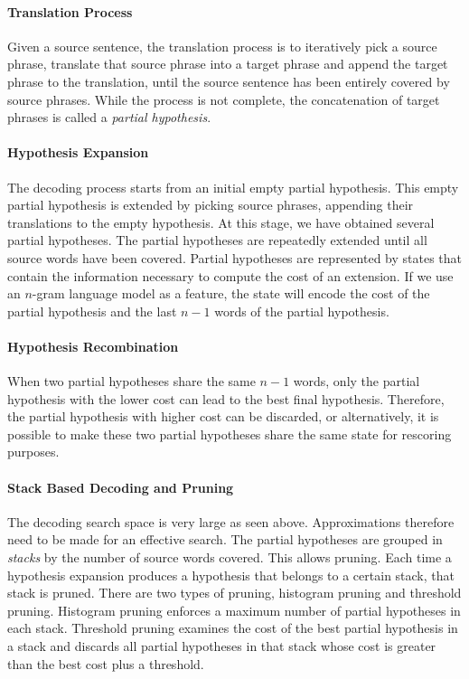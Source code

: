 \paragraph{Translation Process}

Given a source sentence, the translation process is to iteratively
pick a source phrase, translate that source phrase into a target phrase
and append the target phrase to the translation, until the source
sentence has been entirely covered by source phrases. While the process is not
complete, the concatenation of target phrases is called a
\emph{partial hypothesis}.

\paragraph{Hypothesis Expansion}

The decoding process starts from an initial empty partial hypothesis.
This empty partial hypothesis is extended by picking source phrases,
appending their translations to the empty hypothesis.
At this stage, we have obtained several partial hypotheses.
The partial hypotheses are repeatedly extended until
all source words have been covered.
Partial hypotheses are represented by states
that contain the information necessary to
compute the cost of an extension.
If we use an $n$-gram language model as a feature,
the state will encode the cost of the partial hypothesis
and the last $n - 1$ words of the partial hypothesis.

\paragraph{Hypothesis Recombination}
\label{sec:phraseBasedHypothesisRecombination}

When two partial hypotheses share the same $n - 1$
words, only the partial hypothesis with the lower
cost can lead to the best final hypothesis. Therefore,
the partial hypothesis with higher cost can be discarded, or
alternatively, it is possible to make these two partial
hypotheses share the same state for rescoring purposes.

\paragraph{Stack Based Decoding and Pruning}
\label{sec:phraseBasedPruning}

The decoding search space is very large
as seen above. Approximations
therefore need to be made for an effective search.
The partial hypotheses are grouped in \emph{stacks}
by the number of source words covered.
This allows pruning. Each time a hypothesis expansion produces a hypothesis that
belongs to a certain stack, that stack is pruned.
There are two types of pruning, histogram pruning and threshold
pruning. Histogram pruning enforces a maximum number
of partial hypotheses in each stack. Threshold pruning
examines the cost of the best partial hypothesis in a stack
and discards all partial hypotheses in that stack whose cost
is greater than the best cost plus a threshold.

